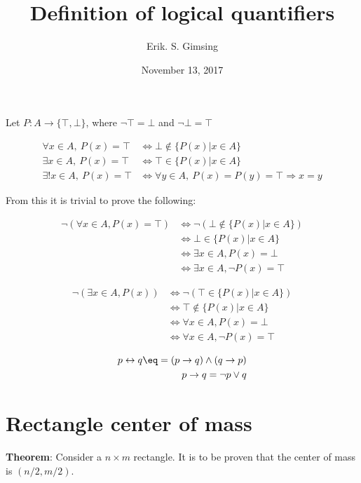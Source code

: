 \documentclass{article}
\title{Definition of logical quantifiers}
\author{Erik. S. Gimsing}
\date{November 13, 2017}
\begin{document}
\maketitle

Let $P: A \rightarrow \{\top,\bot \}$, where $\neg \top = \bot$ and 
$\neg \bot = \top$

\begin{align}
	\forall x \in A,\ P(x) = \top 
	&\Leftrightarrow \bot \notin \{P(x)|x \in A\} \\
	\exists x \in A,\ P(x) = \top
	&\Leftrightarrow \top \in \{P(x)|x \in A\} \\
	\exists! x \in A,\ P(x) = \top &\Leftrightarrow \forall y \in A,\ 
	P(x) = P(y) = \top \Rightarrow x = y
\end{align}

From this it is trivial to prove the following:

\begin{align}
	\neg (\forall x \in A, P(x) = \top) &\Leftrightarrow 
	\neg (\bot \notin \{P(x)|x \in A\}) \\
	&\Leftrightarrow \bot \in \{P(x)|x \in A \} \nonumber \\
	&\Leftrightarrow \exists x \in A, P(x) = \bot \nonumber \\
	&\Leftrightarrow \exists x \in A, \neg P(x) = \top \nonumber
\end{align}

\begin{align}
	\neg (\exists x \in A, P(x)) &\Leftrightarrow 
	\neg ( \top \in \{P(x)|x \in A\} ) \\
	&\Leftrightarrow \top \notin  \{P(x)|x \in A\} \nonumber \\
	&\Leftrightarrow \forall x \in A, P(x) = \bot \nonumber \\
	&\Leftrightarrow \forall x \in A, \neg P(x) = \top \nonumber
\end{align}


\begin{align}
	p \leftrightarrow q \eq = (p \rightarrow q) \land (q \rightarrow p) \\
	p \rightarrow q = \neg p \lor q
\end{align}

\newpage

\section{Rectangle center of mass}
\textbf{Theorem}:
Consider a $n \times m$ rectangle. It is to be proven that the center of 
mass is $(n/2,m/2)$.
\end{document}
